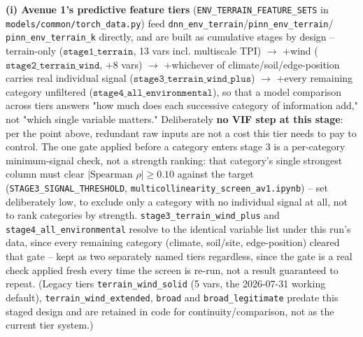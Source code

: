 \textbf{(i) Avenue 1's predictive feature tiers} (\texttt{ENV\_TERRAIN\_FEATURE\_SETS} in
\texttt{models/common/torch\_data.py}) feed \texttt{dnn\_env\_terrain}/\texttt{pinn\_env\_terrain}/
\texttt{pinn\_env\_terrain\_k} directly, and are built as cumulative stages by design --
terrain-only ($\texttt{stage1\_terrain}$, 13 vars incl. multiscale TPI) $\to$ +wind
($\texttt{stage2\_terrain\_wind}$, +8 vars) $\to$ +whichever of climate/soil/edge-position carries
real individual signal ($\texttt{stage3\_terrain\_wind\_plus}$) $\to$ +every remaining category
unfiltered ($\texttt{stage4\_all\_environmental}$), so that a model comparison across tiers
answers "how much does each successive category of information add," not "which single variable
matters." Deliberately \textbf{no VIF step at this stage}: per the point above, redundant raw
inputs are not a cost this tier needs to pay to control. The one gate applied before a category
enters stage 3 is a per-category minimum-signal check, not a strength ranking: that category's
single strongest column must clear $|\text{Spearman }\rho|\ge 0.10$ against the target
(\texttt{STAGE3\_SIGNAL\_THRESHOLD}, \texttt{multicollinearity\_screen\_av1.ipynb}) -- set
deliberately low, to exclude only a category with no individual signal at all, not to rank
categories by strength. \texttt{stage3\_terrain\_wind\_plus} and \texttt{stage4\_all\_environmental}
resolve to the identical variable list under this run's data, since every remaining category
(climate, soil/site, edge-position) cleared that gate -- kept as two separately named tiers
regardless, since the gate is a real check applied fresh every time the screen is re-run, not a
result guaranteed to repeat.
(Legacy tiers \texttt{terrain\_wind\_solid} (5 vars, the 2026-07-31 working default),
\texttt{terrain\_wind\_extended}, \texttt{broad} and \texttt{broad\_legitimate} predate this
staged design and are retained in code for continuity/comparison, not as the current tier
system.)

